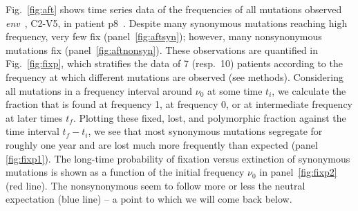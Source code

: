 \documentclass[rmp, twocolumn]{revtex4}
\newcommand{\FIG}[1]{Fig.~\ref{fig:#1}}
\newcommand{\env}{\textit{env}}
\begin{document}
\FIG{aft} shows time series data of the frequencies of all mutations observed
\env~, C2-V5, in patient p8~\citep{shankarappa_consistent_1999}. Despite many
synonymous mutations reaching high frequency, very few fix
(panel~\ref{fig:aftsyn}); however, many nonsynonymous mutations fix
(panel~\ref{fig:aftnonsyn}).
These observations are quantified in \FIG{fixp}, which stratifies the data
of 7 (resp.~10) patients according to the frequency at which
different mutations are observed (see methods). Considering all mutations in a
frequency interval around $\nu_0$ at some time $t_i$, we calculate the fraction
that is found at frequency 1, at frequency 0, or at intermediate frequency at
later times $t_f$. Plotting these fixed, lost, and polymorphic fraction against
the time interval $t_f-t_i$, we see that most synonymous mutations segregate for
roughly one year and are lost much more frequently than expected (panel
\ref{fig:fixp1}). The long-time probability of fixation versus extinction of
synonymous mutations is shown as a function of the initial frequency $\nu_0$
in panel~\ref{fig:fixp2} (red line). The nonsynonymous seem to follow more or
less the neutral expectation (blue line) -- a point to which we will come back
below. 
\end{document}
